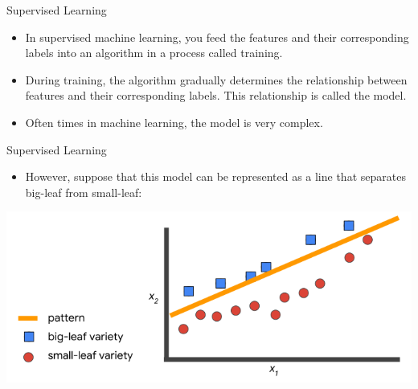 \documentclass{beamer}
\begin{document}

\begin{frame}{Supervised Learning}

\begin{itemize}
\item In supervised machine learning, you feed the features and their corresponding labels into an algorithm in a process called training. 

\item During training, the algorithm gradually determines the relationship between features and their corresponding labels. This relationship is called the model. 

\item Often times in machine learning, the model is very complex. 

\end{itemize}

\end{frame}

\begin{frame}{Supervised Learning}

\begin{itemize}

\item However, suppose that this model can be represented as a line that separates big-leaf from small-leaf:

\end{itemize}

\bigskip

\includegraphics[width=\textwidth]{images/Graph2.png}

\end{frame}

\end{document}
